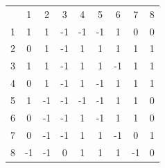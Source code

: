 \documentclass[12pt,a4paper,bibliography=totocnumbered,listof=totocnumbered]{article}
\begin{document}
\begin{figure} [h]
\centering
\begin{minipage}[b]{0.4\textwidth}
\centering
\begin{tabular}{ccccccccc}
                       & 1                       & 2                       & 3                       & 4                       & 5                       & 6                       & 7                       & 8                      \\ \cline{2-9} 
\multicolumn{1}{c|}{1} & \multicolumn{1}{c|}{1}  & \multicolumn{1}{c|}{1}  & \multicolumn{1}{c|}{-1} & \multicolumn{1}{c|}{-1} & \multicolumn{1}{c|}{-1} & \multicolumn{1}{c|}{1}  & \multicolumn{1}{c|}{0}  & \multicolumn{1}{c|}{0} \\ \cline{2-9} 
\multicolumn{1}{c|}{2} & \multicolumn{1}{c|}{0}  & \multicolumn{1}{c|}{1}  & \multicolumn{1}{c|}{-1} & \multicolumn{1}{c|}{1}  & \multicolumn{1}{c|}{1}  & \multicolumn{1}{c|}{1}  & \multicolumn{1}{c|}{1}  & \multicolumn{1}{c|}{1} \\ \cline{2-9} 
\multicolumn{1}{c|}{3} & \multicolumn{1}{c|}{1}  & \multicolumn{1}{c|}{1}  & \multicolumn{1}{c|}{-1} & \multicolumn{1}{c|}{1}  & \multicolumn{1}{c|}{1}  & \multicolumn{1}{c|}{-1} & \multicolumn{1}{c|}{1}  & \multicolumn{1}{c|}{1} \\ \cline{2-9} 
\multicolumn{1}{c|}{4} & \multicolumn{1}{c|}{0}  & \multicolumn{1}{c|}{1}  & \multicolumn{1}{c|}{-1} & \multicolumn{1}{c|}{1}  & \multicolumn{1}{c|}{-1} & \multicolumn{1}{c|}{1}  & \multicolumn{1}{c|}{1}  & \multicolumn{1}{c|}{1} \\ \cline{2-9} 
\multicolumn{1}{c|}{5} & \multicolumn{1}{c|}{1}  & \multicolumn{1}{c|}{-1} & \multicolumn{1}{c|}{-1} & \multicolumn{1}{c|}{-1} & \multicolumn{1}{c|}{-1} & \multicolumn{1}{c|}{1}  & \multicolumn{1}{c|}{1}  & \multicolumn{1}{c|}{0} \\ \cline{2-9} 
\multicolumn{1}{c|}{6} & \multicolumn{1}{c|}{0}  & \multicolumn{1}{c|}{-1} & \multicolumn{1}{c|}{-1} & \multicolumn{1}{c|}{1}  & \multicolumn{1}{c|}{-1} & \multicolumn{1}{c|}{1}  & \multicolumn{1}{c|}{1}  & \multicolumn{1}{c|}{0} \\ \cline{2-9} 
\multicolumn{1}{c|}{7} & \multicolumn{1}{c|}{0}  & \multicolumn{1}{c|}{-1} & \multicolumn{1}{c|}{-1} & \multicolumn{1}{c|}{1}  & \multicolumn{1}{c|}{1}  & \multicolumn{1}{c|}{-1} & \multicolumn{1}{c|}{0}  & \multicolumn{1}{c|}{1} \\ \cline{2-9} 
\multicolumn{1}{c|}{8} & \multicolumn{1}{c|}{-1} & \multicolumn{1}{c|}{-1} & \multicolumn{1}{c|}{0}  & \multicolumn{1}{c|}{1}  & \multicolumn{1}{c|}{1}  & \multicolumn{1}{c|}{1}  & \multicolumn{1}{c|}{-1} & \multicolumn{1}{c|}{0} \\ \cline{2-9} 
\end{tabular}
    \label{abb:nn-erg-field}


\end{minipage}
\end{figure}
\end{document}
